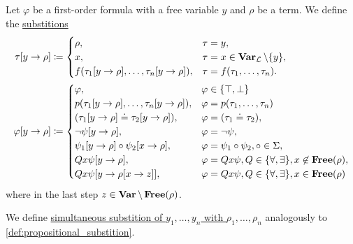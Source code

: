 \begin{definition}\label{def:first_order_substition}
  Let $\varphi$ be a first-order formula with a free variable $y$ and $\rho$ be a term. We define the \ul{substitions}
  \begin{align*}
    \tau[y \to \rho] &\coloneqq \begin{cases}
      \rho,                                              &\tau = y, \\
      x,                                                 &\tau = x \in \operatorname{\mathbf{Var}}_{\mathcal L} \setminus \{ y \}, \\
      f(\tau_1[y \to \rho], \ldots, \tau_n[y \to \rho]), &\tau = f(\tau_1, \ldots, \tau_n).
    \end{cases}
    \\
    \varphi[y \to \rho] &\coloneqq \begin{cases}
      \varphi,                                           &\varphi \in \{ \top, \bot \} \\
      p(\tau_1[y \to \rho], \ldots, \tau_n[y \to \rho]), &\varphi = p(\tau_1, \ldots, \tau_n) \\
      (\tau_1[y \to \rho] \doteq \tau_2[y \to \rho]),    &\varphi = (\tau_1 \doteq \tau_2), \\
      \neg \psi[y \to \rho],                             &\varphi = \neg \psi, \\
      \psi_1[y \to \rho] \circ \psi_2[x \to \rho],       &\varphi = \psi_1 \circ \psi_2, \circ \in \Sigma, \\
      Q x \psi[y \to \rho],                              &\varphi = Q x \psi, Q \in \{ \forall, \exists \}, x \not\in \operatorname{\mathbf{Free}}(\rho), \\
      Q x \psi[y \to \rho[x \to z]],                     &\varphi = Q x \psi, Q \in \{ \forall, \exists \}, x \in \operatorname{\mathbf{Free}}(\rho)
    \end{cases}
  \end{align*}
  where in the last step $z \in \operatorname{\mathbf{Var}} \setminus \operatorname{\mathbf{Free}}(\rho)$.

  We define \ul{simultaneous substition of $y_1, \ldots, y_n$ with $\rho_1, \ldots, \rho_n$} analogously to \cref{def:propositional_substition}.
\end{definition}

